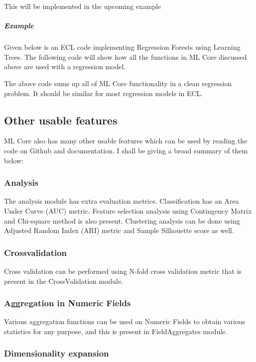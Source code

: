 This will be implemented in the upcoming example

\subparagraph{Example}\label{regression:example}

Given below is an ECL code implementing Regression Forests using Learning Trees. The following code will show how all the functions in ML Core discussed above are used with a regression model.



The above code sums up all of ML Core functionality in a clean regression problem. It should be similar for most regression models in ECL.

\subsection{Other usable features}

ML Core also has many other usable features which can be used by reading the code on Github and documentation. I shall be giving a broad summary of them below:

\subsubsection{Analysis}

The analysis module has extra evaluation metrics. Classification has an Area Under Curve (AUC) metric. Feature selection analysis using Contingency Matrix and Chi-square method is also present. Clustering analysis can be done using Adjusted Random Index (ARI) metric and Sample Silhouette score as well.

\subsubsection{Crossvalidation}

Cross validation can be performed using N-fold cross validation metric that is present in the CrossValidation module.

\subsubsection{Aggregation in Numeric Fields}

Various aggregation functions can be used on Numeric Fields to obtain various statistics for any purpose, and this is present in FieldAggregates module.

\subsubsection{Dimensionality expansion}

